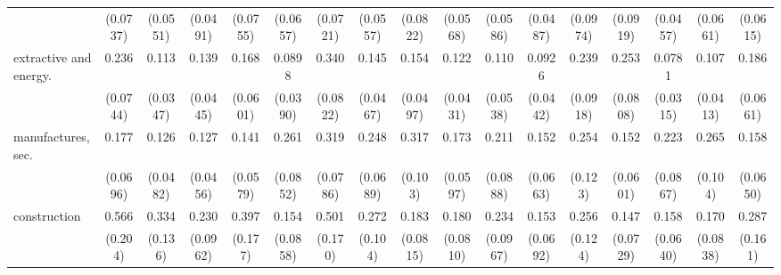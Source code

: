 {\begin{tabular}{l*{16}{c}}
                    &    (0.0737)         &    (0.0551)         &    (0.0491)         &    (0.0755)         &    (0.0657)         &    (0.0721)         &    (0.0557)         &    (0.0822)         &    (0.0568)         &    (0.0586)         &    (0.0487)         &    (0.0974)         &    (0.0919)         &    (0.0457)         &    (0.0661)         &    (0.0615)         \\
[1em]
extractive and energy.&       0.236\sym{***}&       0.113\sym{***}&       0.139\sym{***}&       0.168\sym{***}&      0.0898\sym{***}&       0.340\sym{***}&       0.145\sym{***}&       0.154\sym{***}&       0.122\sym{***}&       0.110\sym{***}&      0.0926\sym{***}&       0.239\sym{***}&       0.253\sym{***}&      0.0781\sym{***}&       0.107\sym{***}&       0.186\sym{***}\\
                    &    (0.0744)         &    (0.0347)         &    (0.0445)         &    (0.0601)         &    (0.0390)         &    (0.0822)         &    (0.0467)         &    (0.0497)         &    (0.0431)         &    (0.0538)         &    (0.0442)         &    (0.0918)         &    (0.0808)         &    (0.0315)         &    (0.0413)         &    (0.0661)         \\
[1em]
manufactures, sec.  &       0.177\sym{***}&       0.126\sym{***}&       0.127\sym{***}&       0.141\sym{***}&       0.261\sym{***}&       0.319\sym{***}&       0.248\sym{***}&       0.317\sym{***}&       0.173\sym{***}&       0.211\sym{***}&       0.152\sym{***}&       0.254\sym{**} &       0.152\sym{***}&       0.223\sym{***}&       0.265\sym{***}&       0.158\sym{***}\\
                    &    (0.0696)         &    (0.0482)         &    (0.0456)         &    (0.0579)         &    (0.0852)         &    (0.0786)         &    (0.0689)         &     (0.103)         &    (0.0597)         &    (0.0888)         &    (0.0663)         &     (0.123)         &    (0.0601)         &    (0.0867)         &     (0.104)         &    (0.0650)         \\
[1em]
construction        &       0.566         &       0.334\sym{**} &       0.230\sym{***}&       0.397\sym{*}  &       0.154\sym{***}&       0.501\sym{*}  &       0.272\sym{***}&       0.183\sym{***}&       0.180\sym{***}&       0.234\sym{***}&       0.153\sym{***}&       0.256\sym{**} &       0.147\sym{***}&       0.158\sym{***}&       0.170\sym{***}&       0.287\sym{*}  \\
                    &     (0.204)         &     (0.136)         &    (0.0962)         &     (0.177)         &    (0.0858)         &     (0.170)         &     (0.104)         &    (0.0815)         &    (0.0810)         &    (0.0967)         &    (0.0692)         &     (0.124)         &    (0.0729)         &    (0.0640)         &    (0.0838)         &     (0.161)         \\

\end{tabular}}
